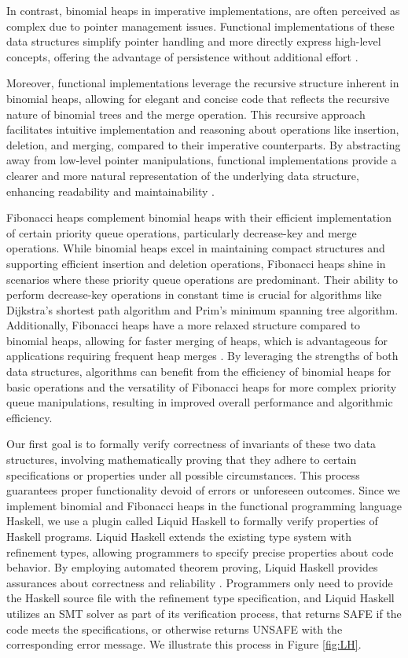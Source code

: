\documentclass{clmthesis}
\begin{document}
In contrast, binomial heaps in imperative implementations, are often perceived as complex due to pointer management issues. Functional implementations of these data structures simplify pointer handling and more directly express high-level concepts, offering the advantage of persistence without additional effort \cite{okasaki1999}.

Moreover, functional implementations leverage the recursive structure inherent in binomial heaps, allowing for elegant and concise code that reflects the recursive nature of binomial trees and the merge operation. This recursive approach facilitates intuitive implementation and reasoning about operations like insertion, deletion, and merging, compared to their imperative counterparts. By abstracting away from low-level pointer manipulations, functional implementations provide a clearer and more natural representation of the underlying data structure, enhancing readability and maintainability \cite{king1994functional, okasaki1999}.

Fibonacci heaps complement binomial heaps with their efficient implementation of certain priority queue operations, particularly decrease-key and merge operations. While binomial heaps excel in maintaining compact structures and supporting efficient insertion and deletion operations, Fibonacci heaps shine in scenarios where these priority queue operations are predominant. Their ability to perform decrease-key operations in constant time is crucial for algorithms like Dijkstra's shortest path algorithm and Prim's minimum spanning tree algorithm. Additionally, Fibonacci heaps have a more relaxed structure compared to binomial heaps, allowing for faster merging of heaps, which is advantageous for applications requiring frequent heap merges \cite{thomas2022}. By leveraging the strengths of both data structures, algorithms can benefit from the efficiency of binomial heaps for basic operations and the versatility of Fibonacci heaps for more complex priority queue manipulations, resulting in improved overall performance and algorithmic efficiency.

Our first goal is to formally verify correctness of invariants of these two data structures, involving mathematically proving that they adhere to certain specifications or properties under all possible circumstances. This process guarantees proper functionality devoid of errors or unforeseen outcomes.
Since we implement binomial and Fibonacci heaps in the functional programming language Haskell, we use a plugin called Liquid Haskell to formally verify properties of Haskell programs. Liquid Haskell extends the existing type system with refinement types, allowing programmers to specify precise properties about code behavior. By employing automated theorem proving, Liquid Haskell provides assurances about correctness and reliability \cite{vazou2016liquid}. Programmers only need to provide the Haskell source file with the refinement type specification, and Liquid Haskell utilizes an SMT solver as part of its verification process, that returns SAFE if the code meets the specifications, or otherwise returns UNSAFE with the corresponding error message. We illustrate this process in Figure \ref{fig:LH}.
\end{document}
